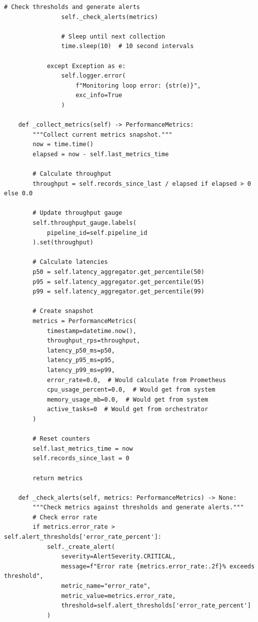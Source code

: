 \begin{lstlisting}[style=python, caption=PipelineMonitor with Performance Tracking]
                # Check thresholds and generate alerts
                self._check_alerts(metrics)

                # Sleep until next collection
                time.sleep(10)  # 10 second intervals

            except Exception as e:
                self.logger.error(
                    f"Monitoring loop error: {str(e)}",
                    exc_info=True
                )

    def _collect_metrics(self) -> PerformanceMetrics:
        """Collect current metrics snapshot."""
        now = time.time()
        elapsed = now - self.last_metrics_time

        # Calculate throughput
        throughput = self.records_since_last / elapsed if elapsed > 0 else 0.0

        # Update throughput gauge
        self.throughput_gauge.labels(
            pipeline_id=self.pipeline_id
        ).set(throughput)

        # Calculate latencies
        p50 = self.latency_aggregator.get_percentile(50)
        p95 = self.latency_aggregator.get_percentile(95)
        p99 = self.latency_aggregator.get_percentile(99)

        # Create snapshot
        metrics = PerformanceMetrics(
            timestamp=datetime.now(),
            throughput_rps=throughput,
            latency_p50_ms=p50,
            latency_p95_ms=p95,
            latency_p99_ms=p99,
            error_rate=0.0,  # Would calculate from Prometheus
            cpu_usage_percent=0.0,  # Would get from system
            memory_usage_mb=0.0,  # Would get from system
            active_tasks=0  # Would get from orchestrator
        )

        # Reset counters
        self.last_metrics_time = now
        self.records_since_last = 0

        return metrics

    def _check_alerts(self, metrics: PerformanceMetrics) -> None:
        """Check metrics against thresholds and generate alerts."""
        # Check error rate
        if metrics.error_rate > self.alert_thresholds['error_rate_percent']:
            self._create_alert(
                severity=AlertSeverity.CRITICAL,
                message=f"Error rate {metrics.error_rate:.2f}% exceeds threshold",
                metric_name="error_rate",
                metric_value=metrics.error_rate,
                threshold=self.alert_thresholds['error_rate_percent']
            )


\end{lstlisting}

